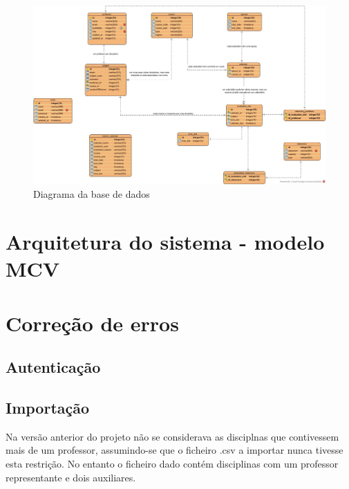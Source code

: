 \documentclass[12pt, twoside]{report}
\begin{document}
	\clearpage
	\begin{landscape}
		\pagestyle{empty}
		
		\begin{figure}[H] 
			\centering 			\includegraphics[width=1.4\textwidth,height=1.4\textheight,keepaspectratio]{image/databaseDiagram}
			\caption{Diagrama da base de dados}
			\label{planeamentoinicial}
			
		\end{figure}
		
		
	\end{landscape}
	
	\section{Arquitetura do sistema - modelo MCV}
	
	
	\section{Correção de erros}

	\subsection{Autenticação}	
	\subsection{Importação}
	
	Na versão anterior do projeto não se considerava as disciplnas que contivessem mais de um professor, assumindo-se que o ficheiro .csv a importar nunca tivesse esta restrição. No entanto o ficheiro dado contém disciplinas com um professor representante e dois auxiliares. 
	
\end{document}
